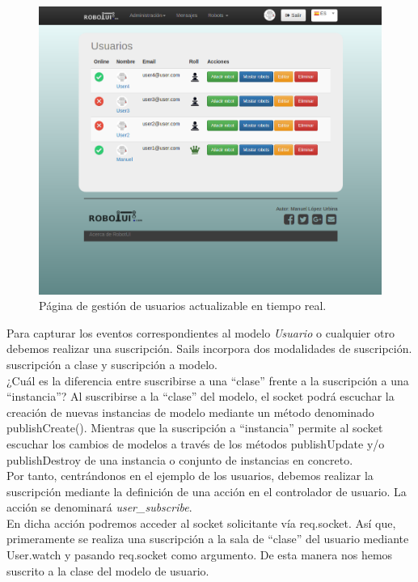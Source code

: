 \begin{figure}[H]
  \begin{center}
    \includegraphics[scale=0.35]{imagenes/comunicaciones/index-usuarios.png}
  \end{center}
  \caption{Página de gestión de usuarios actualizable en tiempo real.}
  \label{view:userindex}
\end{figure}

Para capturar los eventos correspondientes al modelo \emph{Usuario} o cualquier otro debemos realizar una suscripción. Sails incorpora dos modalidades de suscripción. suscripción a clase y 
suscripción a modelo.\\

¿Cuál es la diferencia entre suscribirse a una ``clase'' frente a la suscripción a una ``instancia''? Al suscribirse a la ``clase'' del modelo, el socket podrá escuchar la creación de 
nuevas instancias de modelo mediante un método denominado publishCreate(). Mientras que la suscripción a ``instancia'' permite al socket escuchar los cambios de modelos
a través de los métodos publishUpdate y/o publishDestroy de una instancia o conjunto de instancias en concreto.\\


Por tanto, centrándonos en el ejemplo de los usuarios, debemos realizar la suscripción mediante la definición de una acción en el controlador de usuario. La acción se denominará \emph{user\_subscribe}.\\

En dicha acción podremos acceder al socket solicitante vía req.socket. Así que, primeramente se realiza una suscripción a la sala de ``clase'' del usuario mediante User.watch y pasando 
req.socket como argumento. De esta manera nos hemos suscrito a la clase del modelo de usuario.\\

